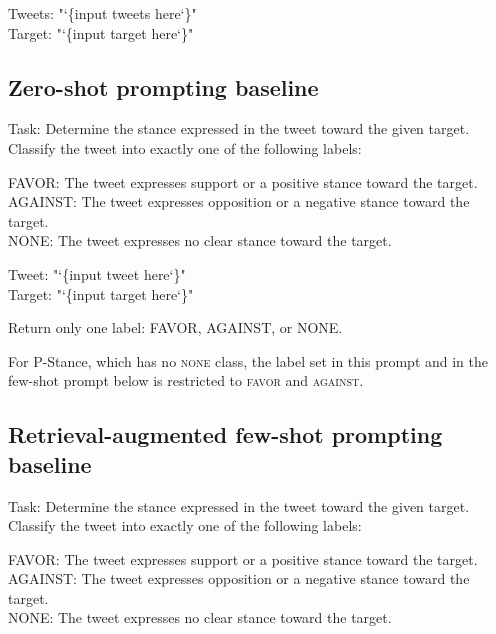 \documentclass[pdflatex,sn-mathphys-num,iicol]{sn-jnl}%
\newcommand{\ttlbrace}{\char`\{}
\newcommand{\ttrbrace}{\char`\}}
\begin{document}
\begin{appendices}
\begin{tcolorbox}[colframe=snrule, colback=snbox, boxrule=0.6pt, arc=3pt, width=\linewidth, left=5pt, right=5pt, top=4pt, bottom=4pt]
	Tweets: "\ttlbrace input tweets here\ttrbrace" \\
	Target: "\ttlbrace input target here\ttrbrace"
\end{tcolorbox}

\subsection{Zero-shot prompting baseline}\label{secA12}
\begin{tcolorbox}[colframe=snrule, colback=snbox, boxrule=0.6pt, arc=3pt, width=\linewidth, left=5pt, right=5pt, top=4pt, bottom=4pt]
	\footnotesize\ttfamily\raggedright\setlength{\parindent}{0pt}\setlength{\parskip}{0.25\baselineskip}\noindent
	Task: Determine the stance expressed in the tweet toward the given target. Classify the tweet into exactly one of the following labels:

	FAVOR: The tweet expresses support or a positive stance toward the target. \\
	AGAINST: The tweet expresses opposition or a negative stance toward the target. \\
	NONE: The tweet expresses no clear stance toward the target.

	Tweet: "\ttlbrace input tweet here\ttrbrace" \\
	Target: "\ttlbrace input target here\ttrbrace"

	Return only one label: FAVOR, AGAINST, or NONE.
\end{tcolorbox}

For P-Stance, which has no \textsc{none} class, the label set in this prompt and in the few-shot prompt below is restricted to \textsc{favor} and \textsc{against}.

\subsection{Retrieval-augmented few-shot prompting baseline}\label{secA13}
\begin{tcolorbox}[colframe=snrule, colback=snbox, boxrule=0.6pt, arc=3pt, width=\linewidth, left=5pt, right=5pt, top=4pt, bottom=4pt]
	\footnotesize\ttfamily\raggedright\setlength{\parindent}{0pt}\setlength{\parskip}{0.25\baselineskip}\noindent
	Task: Determine the stance expressed in the tweet toward the given target. Classify the tweet into exactly one of the following labels:

	FAVOR: The tweet expresses support or a positive stance toward the target. \\
	AGAINST: The tweet expresses opposition or a negative stance toward the target. \\
	NONE: The tweet expresses no clear stance toward the target.


\end{tcolorbox}
\end{appendices}
\end{document}
